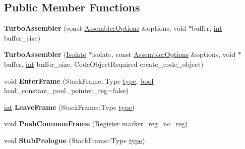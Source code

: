 \subsection*{Public Member Functions}
\begin{DoxyCompactItemize}
\item 
\mbox{\label{classv8_1_1internal_1_1TurboAssembler_ac5a1cdee47961f289dbb095cc534ef95}} 
{\bfseries Turbo\+Assembler} (const \mbox{\hyperlink{structv8_1_1internal_1_1AssemblerOptions}{Assembler\+Options}} \&options, void $\ast$buffer, \mbox{\hyperlink{classint}{int}} buffer\+\_\+size)
\item 
\mbox{\label{classv8_1_1internal_1_1TurboAssembler_ac5d3c303e7abed78a6c1fe7f9834c045}} 
{\bfseries Turbo\+Assembler} (\mbox{\hyperlink{classv8_1_1internal_1_1Isolate}{Isolate}} $\ast$isolate, const \mbox{\hyperlink{structv8_1_1internal_1_1AssemblerOptions}{Assembler\+Options}} \&options, void $\ast$buffer, \mbox{\hyperlink{classint}{int}} buffer\+\_\+size, Code\+Object\+Required create\+\_\+code\+\_\+object)
\item 
\mbox{\label{classv8_1_1internal_1_1TurboAssembler_a57fdf7de333af641574c0bd4c4b7f8d4}} 
void {\bfseries Enter\+Frame} (Stack\+Frame\+::\+Type \mbox{\hyperlink{classstd_1_1conditional_1_1type}{type}}, \mbox{\hyperlink{classbool}{bool}} load\+\_\+constant\+\_\+pool\+\_\+pointer\+\_\+reg=false)
\item 
\mbox{\label{classv8_1_1internal_1_1TurboAssembler_a6c094e7db7b4b931210a00005cfbc939}} 
\mbox{\hyperlink{classint}{int}} {\bfseries Leave\+Frame} (Stack\+Frame\+::\+Type \mbox{\hyperlink{classstd_1_1conditional_1_1type}{type}})
\item 
\mbox{\label{classv8_1_1internal_1_1TurboAssembler_ad56dfd9e92f69e11627353ea1cbc7e25}} 
void {\bfseries Push\+Common\+Frame} (\mbox{\hyperlink{classv8_1_1internal_1_1Register}{Register}} marker\+\_\+reg=no\+\_\+reg)
\item 
\mbox{\label{classv8_1_1internal_1_1TurboAssembler_a2398db9e10af1223aee6d3d491de79e6}} 
void {\bfseries Stub\+Prologue} (Stack\+Frame\+::\+Type \mbox{\hyperlink{classstd_1_1conditional_1_1type}{type}})

\end{DoxyCompactItemize}
